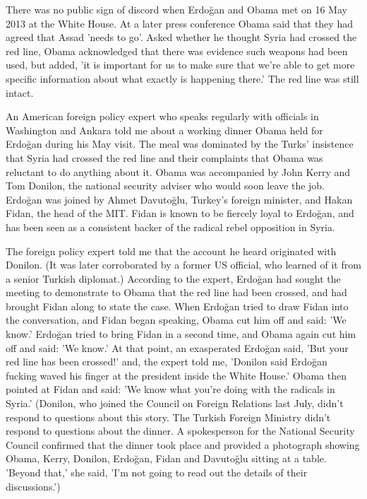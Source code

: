 There was no public sign of discord when Erdo\u{g}an and Obama met
on 16 May 2013 at the White House. At a later press conference Obama
said that they had agreed that Assad 'needs to go'. Asked whether
he thought Syria had crossed the red line, Obama acknowledged that
there was evidence such weapons had been used, but added, 'it is important
for us to make sure that we're able to get more specific information
about what exactly is happening there.' The red line was still intact.

An American foreign policy expert who speaks regularly with officials
in Washington and Ankara told me about a working dinner Obama held
for Erdo\u{g}an during his May visit. The meal was dominated by the
Turks' insistence that Syria had crossed the red line and their complaints
that Obama was reluctant to do anything about it. Obama was accompanied
by John Kerry and Tom Donilon, the national security adviser who would
soon leave the job. Erdo\u{g}an was joined by Ahmet Davuto\u{g}lu,
Turkey's foreign minister, and Hakan Fidan, the head of the MIT. Fidan
is known to be fiercely loyal to Erdo\u{g}an, and has been seen as
a consistent backer of the radical rebel opposition in Syria.

The foreign policy expert told me that the account he heard originated
with Donilon. (It was later corroborated by a former US official,
who learned of it from a senior Turkish diplomat.) According to the
expert, Erdo\u{g}an had sought the meeting to demonstrate to Obama
that the red line had been crossed, and had brought Fidan along to
state the case. When Erdo\u{g}an tried to draw Fidan into the conversation,
and Fidan began speaking, Obama cut him off and said: 'We know.' Erdo\u{g}an
tried to bring Fidan in a second time, and Obama again cut him off
and said: 'We know.' At that point, an exasperated Erdo\u{g}an said,
'But your red line has been crossed!' and, the expert told me, 'Donilon
said Erdo\u{g}an \textquotedbl{}fucking waved his finger at the president
inside the White House\textquotedbl{}.' Obama then pointed at Fidan
and said: 'We know what you're doing with the radicals in Syria.'
(Donilon, who joined the Council on Foreign Relations last July, didn't
respond to questions about this story. The Turkish Foreign Ministry
didn't respond to questions about the dinner. A spokesperson for the
National Security Council confirmed that the dinner took place and
provided a photograph showing Obama, Kerry, Donilon, Erdo\u{g}an,
Fidan and Davuto\u{g}lu sitting at a table. 'Beyond that,' she said,
'I'm not going to read out the details of their discussions.')

